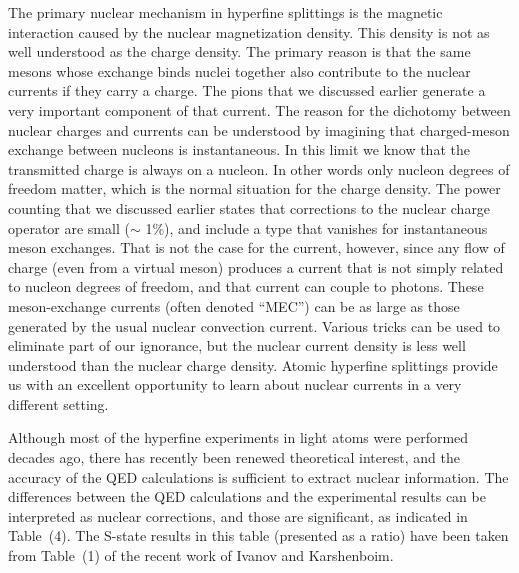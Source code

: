 \documentclass{svmult}
\begin{document}
The primary nuclear mechanism in hyperfine splittings is the magnetic
interaction caused by the nuclear magnetization
density. This density
is not as well understood as the charge density. The primary reason is that
the same mesons whose exchange binds nuclei together also contribute to the
nuclear currents if they carry a charge. The pions that we discussed earlier
generate a very important component of that current\cite{c-mec}. The reason for
the dichotomy between nuclear charges and currents can be understood by 
imagining that charged-meson exchange between nucleons is instantaneous. In this
limit we know that the transmitted charge is always on a nucleon. In other words
only nucleon degrees of freedom matter, which is the normal situation for the 
charge density. The power counting that we discussed 
earlier states that corrections to the nuclear charge operator are small 
($\sim$ 1\%), and include a type that vanishes for instantaneous meson 
exchanges. That is not the case for the current, however, since any flow of
charge (even from a virtual meson) produces a current that is not simply related
to nucleon degrees of freedom, and that current can couple to photons. These 
meson-exchange currents 
(often denoted ``MEC'') can be as large as those generated by the usual nuclear
convection current. Various tricks can be used to eliminate part of our 
ignorance, but the nuclear current density is less well understood than the 
nuclear charge density. Atomic hyperfine splittings provide us with an excellent
opportunity to learn about nuclear currents in a very different setting.

Although most of the hyperfine experiments in light
atoms were performed decades ago, there
has recently been renewed theoretical interest, and the accuracy of the QED
calculations is sufficient to extract nuclear information\cite{sav-nu}. The 
differences between the QED calculations and the experimental results can be 
interpreted as nuclear corrections, and those are significant, as indicated in
Table~(4). The S-state results in this table (presented as a ratio) have been 
taken from Table~(1) of the recent work of Ivanov and Karshenboim\cite{sav-nu}.
\end{document}
